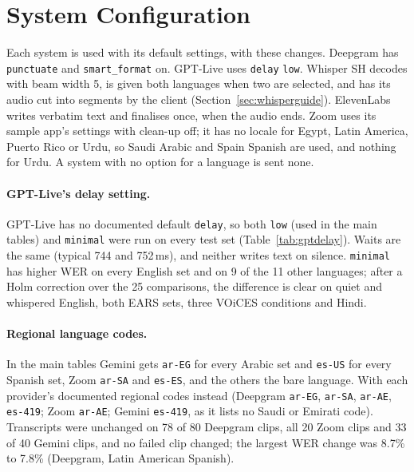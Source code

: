 \documentclass[11pt]{article}
\begin{document}



\FloatBarrier
\appendix
\section{System Configuration}\label{app:systems}
Each system is used with its default settings, with these changes. Deepgram has \texttt{punctuate} and \texttt{smart\_format} on. GPT-Live uses \texttt{delay} \texttt{low}. Whisper SH decodes with beam width 5, is given both languages when two are selected, and has its audio cut into segments by the client (Section~\ref{sec:whisperguide}). ElevenLabs writes verbatim text and finalises once, when the audio ends. Zoom uses its sample app's settings with clean-up off; it has no locale for Egypt, Latin America, Puerto Rico or Urdu, so Saudi Arabic and Spain Spanish are used, and nothing for Urdu. A system with no option for a language is sent none.

\paragraph{GPT-Live's delay setting.} GPT-Live has no documented default \texttt{delay}, so both \texttt{low} (used in the main tables) and \texttt{minimal} were run on every test set (Table~\ref{tab:gptdelay}). Waits are the same (typical 744 and 752\,ms), and neither writes text on silence. \texttt{minimal} has higher WER on every English set and on 9 of the 11 other languages; after a Holm correction over the 25 comparisons, the difference is clear on quiet and whispered English, both EARS sets, three VOiCES conditions and Hindi.

\paragraph{Regional language codes.} In the main tables Gemini gets \texttt{ar-EG} for every Arabic set and \texttt{es-US} for every Spanish set, Zoom \texttt{ar-SA} and \texttt{es-ES}, and the others the bare language. With each provider's documented regional codes instead (Deepgram \texttt{ar-EG}, \texttt{ar-SA}, \texttt{ar-AE}, \texttt{es-419}; Zoom \texttt{ar-AE}; Gemini \texttt{es-419}, as it lists no Saudi or Emirati code). Transcripts were unchanged on 78 of 80 Deepgram clips, all 20 Zoom clips and 33 of 40 Gemini clips, and no failed clip changed; the largest WER change was 8.7\% to 7.8\% (Deepgram, Latin American Spanish).
\end{document}
